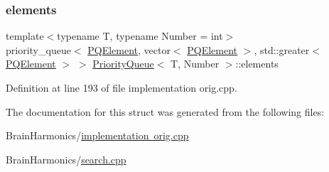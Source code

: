 \subsubsection{\texorpdfstring{elements}{elements}}
{\footnotesize\ttfamily template$<$typename T, typename Number = int$>$ \\
priority\+\_\+queue$<$ \mbox{\hyperlink{struct_priority_queue_ae86a19aae3f9a32a1d76dfdab34eb70b}{P\+Q\+Element}}, vector$<$ \mbox{\hyperlink{struct_priority_queue_ae86a19aae3f9a32a1d76dfdab34eb70b}{P\+Q\+Element}} $>$, std\+::greater$<$ \mbox{\hyperlink{struct_priority_queue_ae86a19aae3f9a32a1d76dfdab34eb70b}{P\+Q\+Element}} $>$ $>$ \mbox{\hyperlink{struct_priority_queue}{Priority\+Queue}}$<$ T, Number $>$\+::elements}



Definition at line 193 of file implementation orig.\+cpp.



The documentation for this struct was generated from the following files\+:\begin{DoxyCompactItemize}
\item 
Brain\+Harmonics/\mbox{\hyperlink{implementation_01orig_8cpp}{implementation orig.\+cpp}}\item 
Brain\+Harmonics/\mbox{\hyperlink{search_8cpp}{search.\+cpp}}\end{DoxyCompactItemize}
